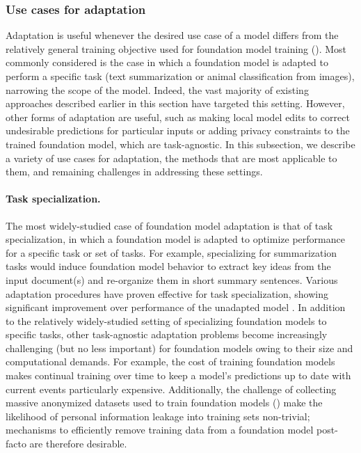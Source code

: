 \subsubsection{Use cases for adaptation}
\label{sec:adaptation-usecases}
Adaptation is useful whenever the desired use case of a model differs from the relatively general training objective used for foundation model training (). Most commonly considered is the case in which a foundation model is adapted to perform a specific task (\eg text summarization or animal classification from images), narrowing the scope of the model. Indeed, the vast majority of existing approaches described earlier in this section have targeted this setting. However, other forms of adaptation are useful, such as making local model edits to correct undesirable predictions for particular inputs or adding privacy constraints to the trained foundation model, which are task-agnostic. In this subsection, we describe a variety of use cases for adaptation, the methods that are most applicable to them, and remaining challenges in addressing these settings.

\paragraph{Task specialization.}
The most widely-studied case of foundation model adaptation is that of task specialization, in which a foundation model is adapted to optimize performance for a specific task or set of tasks. For example, specializing for summarization tasks would induce foundation model behavior to extract key ideas from the input document(s) and re-organize them in short summary sentences. Various adaptation procedures have proven effective for task specialization, showing significant improvement over performance of the unadapted model \citep{howard2018universal,brown2020gpt3}. 
In addition to the relatively widely-studied setting of specializing foundation models to specific tasks, other task-agnostic adaptation problems become increasingly challenging (but no less important) for foundation models owing to their size and computational demands. For example, the cost of training foundation models makes continual training over time to keep a model’s predictions up to date with current events particularly expensive.
Additionally, the challenge of collecting massive anonymized datasets used to train foundation models () make the likelihood of personal information leakage into training sets non-trivial; mechanisms to efficiently remove training data from a foundation model post-facto are therefore desirable.

